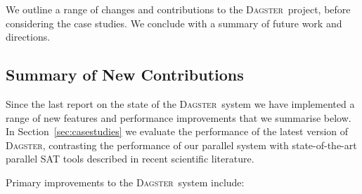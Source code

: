 \documentclass[10pt,a4paper,oneside,headinclude,footinclude,BCOR5mm]{scrartcl}
\newcommand{\dagster}{\textsc{Dagster}\xspace}
\begin{document}
We outline a range of changes and contributions to the \dagster\ project, before considering the case studies.
We conclude with a summary of future work and directions.

\subsection{Summary of New Contributions}

Since the last report on the state of the \dagster\ system we have implemented a range of new features and performance improvements that we summarise below.
In Section~\ref{sec:casestudies} we evaluate the performance of the latest version of \dagster, contrasting the performance of our parallel system with state-of-the-art parallel SAT tools described in recent scientific literature. 

Primary improvements to the \dagster\ system include:
\end{document}
